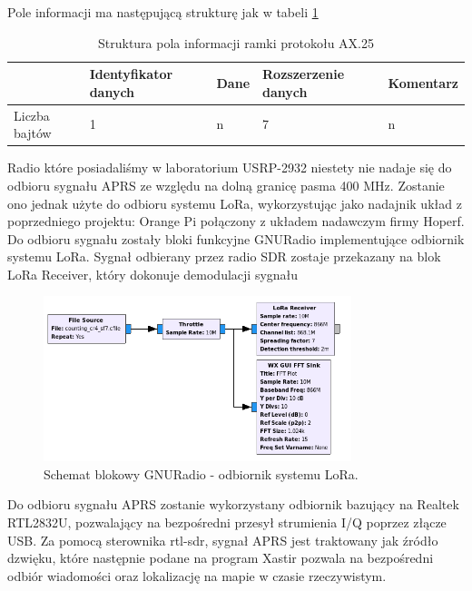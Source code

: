 Pole informacji ma następującą strukturę jak w tabeli \ref{str}

\begin{table}
\centering
\begin{tabular*}{\linewidth}{|l|l|l|l|l|}
\hline
  & Identyfikator danych & Dane & Rozszerzenie danych & Komentarz\\\hline
Liczba bajtów & 1 & n & 7 & n\\\hline
\end{tabular*}
\caption{Struktura pola informacji ramki protokołu AX.25}
\label{str}
\end{table}

Radio które posiadaliśmy w laboratorium USRP-2932 niestety nie nadaje się do odbioru sygnału APRS ze względu na dolną granicę pasma 400 MHz. Zostanie ono jednak użyte do odbioru systemu LoRa, wykorzystując jako nadajnik układ z poprzedniego projektu: Orange Pi połączony z układem nadawczym firmy Hoperf. Do odbioru sygnału zostały bloki funkcyjne GNURadio implementujące odbiornik systemu LoRa. Sygnał odbierany przez radio SDR zostaje przekazany na blok LoRa Receiver, który dokonuje demodulacji sygnału
\begin{figure}[!htbp]
 \includegraphics[width=0.8\textwidth]{lora_pic}
 \centering
 \caption{Schemat blokowy GNURadio - odbiornik systemu LoRa.}
\end{figure}


Do odbioru sygnału APRS zostanie wykorzystany odbiornik bazujący na Realtek RTL2832U, pozwalający na bezpośredni przesył strumienia I/Q poprzez złącze USB. Za pomocą sterownika rtl-sdr, sygnał APRS jest traktowany jak źródło dzwięku, które następnie podane na program Xastir pozwala na bezpośredni odbiór wiadomości oraz lokalizację na mapie w czasie rzeczywistym.

